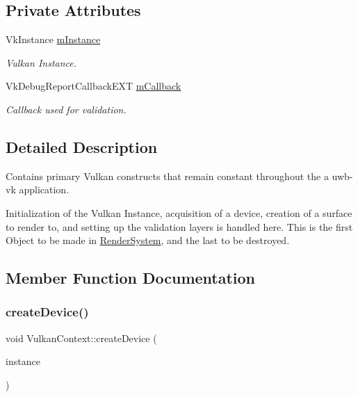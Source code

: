 \subsection*{Private Attributes}
\begin{DoxyCompactItemize}
\item 
\mbox{\label{class_vulkan_context_a094bedd3fe385240c63e0ca7b857f3ce}} 
Vk\+Instance \mbox{\hyperlink{class_vulkan_context_a094bedd3fe385240c63e0ca7b857f3ce}{m\+Instance}}
\begin{DoxyCompactList}\small\item\em Vulkan Instance. \end{DoxyCompactList}\item 
\mbox{\label{class_vulkan_context_ae43e937306f6f72e538b5d6fd8e53f9b}} 
Vk\+Debug\+Report\+Callback\+E\+XT \mbox{\hyperlink{class_vulkan_context_ae43e937306f6f72e538b5d6fd8e53f9b}{m\+Callback}}
\begin{DoxyCompactList}\small\item\em Callback used for validation. \end{DoxyCompactList}\end{DoxyCompactItemize}


\subsection{Detailed Description}
Contains primary Vulkan constructs that remain constant throughout the a uwb-\/vk application. 

Initialization of the Vulkan Instance, acquisition of a device, creation of a surface to render to, and setting up the validation layers is handled here. This is the first Object to be made in \mbox{\hyperlink{class_render_system}{Render\+System}}, and the last to be destroyed. 

\subsection{Member Function Documentation}
\mbox{\label{class_vulkan_context_a0eb4e3eb641460f6b02d3d576089e55e}} 
\subsubsection{\texorpdfstring{createDevice()}{createDevice()}}
{\footnotesize\ttfamily void Vulkan\+Context\+::create\+Device (\begin{DoxyParamCaption}\item[{Vk\+Instance}]{instance }\end{DoxyParamCaption})\hspace{0.3cm}{\ttfamily [private]}}

